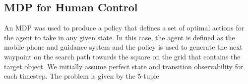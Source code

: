 \documentclass[a4paper, twoside]{article}
\begin{document}




\subsection{MDP for Human Control}

\noindent An MDP was used to produce a policy that defines a set of optimal actions for the agent to take in any given state. In this case, the agent is defined as the mobile phone and guidance system and the policy is used to generate the next waypoint on the search path towards the square on the grid that contains the target object. We initially assume perfect state and transition observability for each timestep. The problem is given by the 5-tuple
\end{document}
